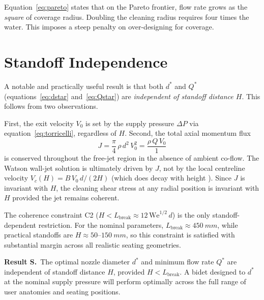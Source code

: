 \documentclass[aps,prfluids,reprint,amsmath,amssymb,floatfix]{revtex4-2}
\newcommand{\We}{\mathrm{We}}
\begin{document}
Equation~\eqref{eq:pareto} states that on the Pareto frontier, flow rate
grows as the \emph{square} of coverage radius. Doubling the cleaning radius
requires four times the water. This imposes a steep penalty on
over-designing for coverage.

\section{Standoff Independence}
\label{sec:standoff}

A notable and practically useful result is that both $d^*$ and $Q^*$
(equations~\eqref{eq:dstar} and~\eqref{eq:Qstar}) are \emph{independent
of standoff distance $H$}. This follows from two observations.

First, the exit velocity $V_0$ is set by the supply pressure $\Delta P$
via equation~\eqref{eq:torricelli}, regardless of $H$. Second, the total
axial momentum flux
\begin{equation}
  J = \frac{\pi}{4}\,\rho\,d^2\,V_0^2 = \frac{\rho\,Q\,V_0}{1}
  \label{eq:momentumflux}
\end{equation}
is conserved throughout the free-jet region in the absence of ambient
co-flow. The Watson wall-jet solution is ultimately driven by $J$, not
by the local centreline velocity $V_c(H) = B\,V_0\,d/(2H)$ (which does
decay with height \citep{PopeBook}). Since $J$ is invariant with $H$,
the cleaning shear stress at any radial position is invariant with $H$
provided the jet remains coherent.

The coherence constraint C2 ($H < L_\mathrm{break} \approx 12\,\We^{1/2}\,d$)
is the only standoff-dependent restriction. For the nominal parameters,
$L_\mathrm{break} \approx \SI{450}{mm}$, while practical standoffs are
$H \approx 50$--$\SI{150}{mm}$, so this constraint is satisfied with
substantial margin across all realistic seating geometries.

\begin{mdframed}[style=resultbox]
\textbf{Result S.}\ The optimal nozzle diameter $d^*$ and minimum flow
rate $Q^*$ are independent of standoff distance $H$, provided $H < L_\mathrm{break}$.
A bidet designed to $d^*$ at the nominal supply pressure will perform
optimally across the full range of user anatomies and seating positions.
\end{mdframed}

\end{document}
